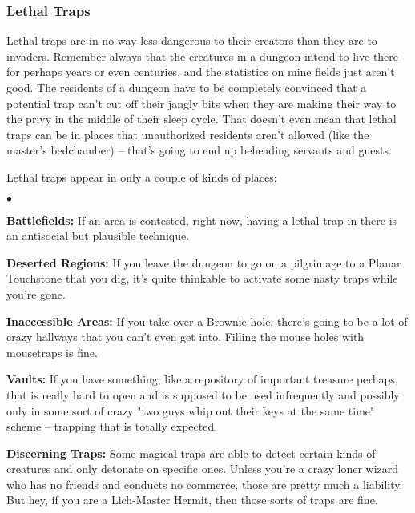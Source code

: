 \subsubsection{Lethal Traps}

Lethal traps are in no way less dangerous to their creators than they are to invaders. Remember always that the creatures in a dungeon intend to live there for perhaps years or even centuries, and the statistics on mine fields just aren't good. The residents of a dungeon have to be completely convinced that a potential trap can't cut off their jangly bits when they are making their way to the privy in the middle of their sleep cycle. That doesn't even mean that lethal traps can be in places that unauthorized residents aren't allowed (like the master's bedchamber) -- that's going to end up beheading servants and guests.

Lethal traps appear in only a couple of kinds of places:

\begin{list}{$\bullet$}{\itemspace}
    \item \textbf{Battlefields:} If an area is contested, right now, having a lethal trap in there is an antisocial but plausible technique.
    \item \textbf{Deserted Regions:} If you leave the dungeon to go on a pilgrimage to a Planar Touchstone that you dig, it's quite thinkable to activate some nasty traps while you're gone.
    \item \textbf{Inaccessible Areas:} If you take over a Brownie hole, there's going to be a lot of crazy hallways that you can't even get into. Filling the mouse holes with mousetraps is fine.
    \item \textbf{Vaults:} If you have something, like a repository of important treasure perhaps, that is really hard to open and is supposed to be used infrequently and possibly only in some sort of crazy "two guys whip out their keys at the same time" scheme -- trapping that is totally expected.
    \item \textbf{Discerning Traps:} Some magical traps are able to detect certain kinds of creatures and only detonate on specific ones. Unless you're a crazy loner wizard who has no friends and conducts no commerce, those are pretty much a liability. But hey, if you are a Lich-Master Hermit, then those sorts of traps are fine.
\end{list}

\vspace*{8pt}

